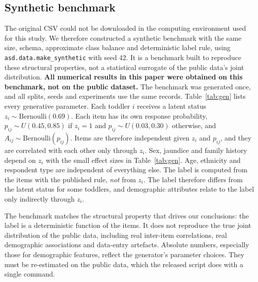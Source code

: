 \documentclass[5p,times,twocolumn]{elsarticle}
\begin{document}
\subsection{Synthetic benchmark}
\label{sec:synth}

The original CSV could not be downloaded in the computing environment used for this study. We therefore constructed a synthetic benchmark with the same size, schema, approximate class balance and deterministic label rule, using \texttt{asd.data.make\_synthetic} with seed 42. It is a benchmark built to reproduce these structural properties, not a statistical surrogate of the public data's joint distribution. \textbf{All numerical results in this paper were obtained on this benchmark, not on the public dataset.} The benchmark was generated once, and all splits, seeds and experiments use the same \NRecords{} records. Table~\ref{tab:gen} lists every generative parameter. Each toddler $i$ receives a latent status $z_i\sim\text{Bernoulli}(0.69)$. Each item has its own response probability, $p_{ij}\sim U(0.45,0.85)$ if $z_i=1$ and $p_{ij}\sim U(0.03,0.30)$ otherwise, and $A_{ij}\sim\text{Bernoulli}(p_{ij})$. Items are therefore independent given $z_i$ and $p_{ij}$, and they are correlated with each other only through $z_i$. Sex, jaundice and family history depend on $z_i$ with the small effect sizes in Table~\ref{tab:gen}. Age, ethnicity and respondent type are independent of everything else. The label is computed from the items with the published rule, \emph{not} from $z_i$. The label therefore differs from the latent status for some toddlers, and demographic attributes relate to the label only indirectly through $z_i$.

The benchmark matches the structural property that drives our conclusions: the label is a deterministic function of the items. It does not reproduce the true joint distribution of the public data, including real inter-item correlations, real demographic associations and data-entry artefacts. Absolute numbers, especially those for demographic features, reflect the generator's parameter choices. They must be re-estimated on the public data, which the released script does with a single command.
\end{document}

